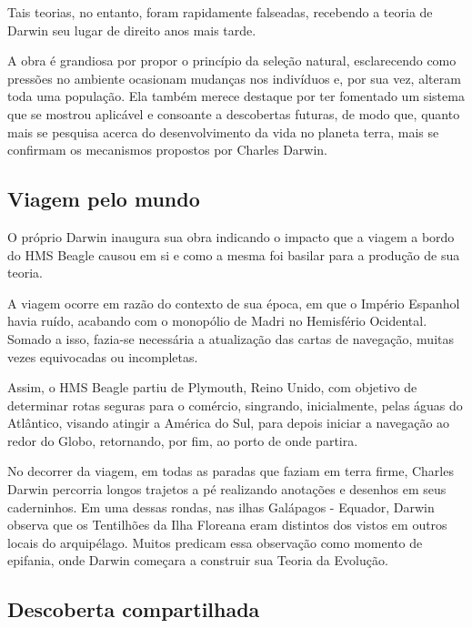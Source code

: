 \documentclass[12pt]{extarticle}
\begin{document}
Tais teorias, no entanto, foram rapidamente falseadas, recebendo a teoria de
Darwin seu lugar de direito anos mais tarde.

A obra é grandiosa por propor o princípio da seleção natural, esclarecendo como
pressões no ambiente ocasionam mudanças nos indivíduos e, por sua vez, alteram
toda uma população. Ela também merece destaque por ter fomentado um sistema que
se mostrou aplicável e consoante a descobertas futuras, de modo que, quanto
mais se pesquisa acerca do desenvolvimento da vida no planeta terra, mais se
confirmam os mecanismos propostos por Charles Darwin.


\subsection{Viagem pelo mundo}

O próprio Darwin inaugura sua obra indicando o impacto que a viagem a bordo do
HMS Beagle causou em si e como a mesma foi basilar para a produção de sua
teoria.




A viagem ocorre em razão do contexto de sua época, em que o Império Espanhol
havia ruído, acabando com o monopólio de Madri no Hemisfério Ocidental. Somado
a isso, fazia-se necessária a atualização das cartas de navegação, muitas vezes
equivocadas ou incompletas.

Assim, o HMS Beagle partiu de Plymouth, Reino Unido, com objetivo de determinar
rotas seguras para o comércio, singrando, inicialmente, pelas águas do
Atlântico, visando atingir a América do Sul, para depois iniciar a navegação ao
redor do Globo, retornando, por fim, ao porto de onde partira.




No decorrer da viagem, em todas as paradas que faziam em terra firme, Charles
Darwin percorria longos trajetos a pé realizando anotações e desenhos em seus
caderninhos. Em uma dessas rondas, nas ilhas Galápagos - Equador, Darwin
observa que os Tentilhões da Ilha Floreana eram distintos dos vistos em outros
locais do arquipélago. Muitos predicam essa observação como momento de
epifania, onde Darwin começara a construir sua Teoria da Evolução.

\subsection{Descoberta compartilhada}
\end{document}
